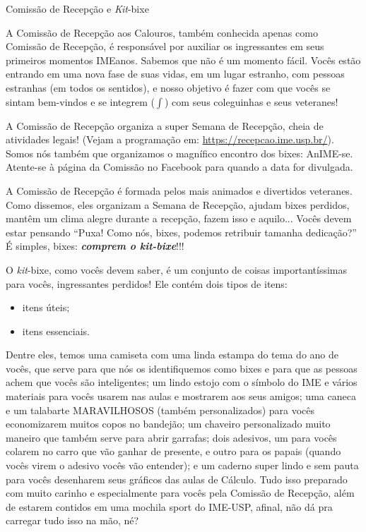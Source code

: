\begin{secao}{Comissão de Recepção e \textit{Kit}-bixe}

A Comissão de Recepção aos Calouros, também conhecida apenas como Comissão de
Recepção, é responsável por auxiliar os ingressantes em seus primeiros momentos
IMEanos. Sabemos que não é um momento fácil. Vocês estão entrando em uma nova fase
de suas vidas, em um lugar estranho, com pessoas estranhas (em todos os sentidos),
e nosso objetivo é fazer com que vocês se sintam bem-vindos e se integrem
($\int$) com seus coleguinhas e seus veteranes!

A Comissão de Recepção organiza a super Semana de Recepção, cheia de atividades
legais! (Vejam a programação em: \url{https://recepcao.ime.usp.br/}).
Somos nós também que organizamos o magnífico encontro dos bixes: AnIME-se.
Atente-se à página da Comissão no Facebook para quando a data for divulgada. %

A Comissão de Recepção é formada pelos mais animados e divertidos veteranes. Como
dissemos, eles organizam a Semana de Recepção, ajudam bixes perdidos, mantêm um clima
alegre durante a recepção, fazem isso e aquilo...
Vocês devem estar pensando ``Puxa! Como nós, bixes, podemos retribuir
tamanha dedicação?'' É simples, bixes: {\bf\em comprem o \textit{kit}-bixe}!!!

O \textit{kit}-bixe, como vocês devem saber, é um conjunto de coisas
importantíssimas para vocês, ingressantes perdidos! Ele contém dois tipos de
itens:
\begin{itemize}
\item itens úteis;
\item itens essenciais.
\end{itemize} %
Dentre eles, temos uma camiseta com uma linda estampa do tema do ano de vocês,
que serve para que nós os identifiquemos como bixes e para que as pessoas
achem que vocês são inteligentes; um lindo estojo com o símbolo do IME e vários materiais
para vocês usarem nas aulas e mostrarem aos seus amigos; uma caneca e um talabarte MARAVILHOSOS
(também personalizados) para vocês economizarem muitos copos no bandejão; um
chaveiro personalizado muito maneiro que também serve para abrir garrafas;
dois adesivos, um para vocês colarem no carro que vão ganhar de presente, e outro
para os papais (quando vocês virem o adesivo vocês vão entender); e um caderno super
lindo e sem pauta para vocês desenharem seus gráficos das aulas de Cálculo. Tudo
isso preparado com muito carinho e especialmente para vocês pela Comissão de Recepção,
além de estarem contidos em uma mochila sport do IME-USP, afinal, não dá pra
carregar tudo isso na mão, né?


\end{secao}
